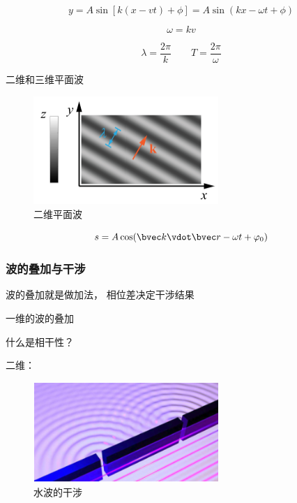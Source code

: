 \begin{equation}
y = A \sin[k(x-vt) + \phi] = A \sin(kx - \omega t + \phi)
\end{equation}

\begin{equation}
\omega = kv
\end{equation}

\begin{equation}
\lambda = \frac{2\pi}{k}
\qquad
T = \frac{2\pi}{\omega}
\end{equation}

二维和三维平面波

\begin{figure}[ht]
\centering
\includegraphics[width=7cm]{./figures/QMIntr6.png}
\caption{二维平面波} \label{QMIntr_fig6}
\end{figure}

\begin{equation}
s = A \cos(\bvec k \vdot \bvec r - \omega t + \varphi_0)
\end{equation}


\subsubsection{波的叠加与干涉}

波的叠加就是做加法， 相位差决定干涉结果

一维的波的叠加

什么是相干性？

二维：

\begin{figure}[ht]
\centering
\includegraphics[width=7cm]{./figures/QMIntr4.png}
\caption{水波的干涉} \label{QMIntr_fig4}
\end{figure}


